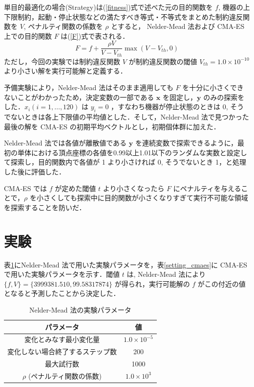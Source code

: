 \documentclass[twocolumn]{jarticle}
\begin{document}
単目的最適化の場合(Strategy)は(\ref{fitness})式で述べた元の目的関数を $f$, 機器の上下限制約，起動・停止状態などの満たすべき等式・不等式をまとめた制約違反関数を $V$, ペナルティ関数の係数を $\rho$ とすると， Nelder-Mead 法および CMA-ES 上での目的関数 $F$ は(\ref{F})式で表される．
\begin{equation}
    \label{F}
    F = f + \frac{\rho V}{V-V_{th}}\max(V-V_{th}, 0)
\end{equation}
ただし，今回の実験では制約違反関数 $V$ が制約違反関数の閾値 $V_{th} = 1.0 \times 10^{-10}$ より小さい解を実行可能解と定義する．

予備実験により，Nelder-Mead 法はそのまま適用しても $F$ を十分に小さくできないことがわかったため，決定変数の一部である $\bm{x}$ を固定し，$\bm{y}$ のみの探索をした．$x_i(i=1,\dots,120)$ は $y_i=0$ ，すなわち機器が停止状態のときは 0, そうでないときは各上下限値の平均値とした．そして，Nelder-Mead 法で見つかった最後の解を CMA-ES の初期平均ベクトルとし，初期個体群に加えた．

Nelder-Mead 法では各値が離散値である $\bm{y}$ を連続変数で探索できるように，最初の単体における頂点座標の各値を0.99以上1.01以下のランダムな実数と設定して探索し，目的関数内で各値が 1 より小さければ 0, そうでないとき 1，と処理した後に評価した．

CMA-ES では $f$ が定めた閾値 $t$ より小さくなったら $F$ にペナルティを与えることで，$\rho$ を小さくしても探索中に目的関数が小さくなりすぎて実行不可能な領域を探索することを防いだ．

\section{実験}
表\ref{setting_nelder}にNelder-Mead 法で用いた実験パラメータを，表\ref{setting_cmaes}に CMA-ES で用いた実験パラメータを示す．閾値 $t$ は, Nelder-Mead 法により $\{f, V\}=\{3999381.510, 99.58317874\}$ が得られ，実行可能解の $f$ がこの付近の値となると予測したことから決定した．
\begin{table}[htbp]
    \begin{center}
        \caption{Nelder-Mead 法の実験パラメータ}
        \label{setting_nelder}
        \begin{tabular}{| c | c |} 
            \hline
            パラメータ & 値 \\ 
            \hline
            変化とみなす最小変化量 & $1.0\times10^{-5}$ \\
            変化しない場合終了するステップ数 & 200 \\
            最大試行数 & 1000 \\
            $\rho$ (ペナルティ関数の係数) & $1.0\times10^{3}$\\ 
            \hline
        \end{tabular}
    \end{center}
\end{table}
\end{document}
